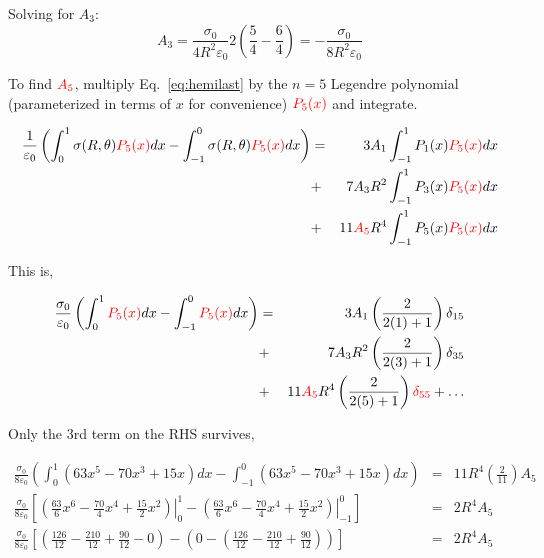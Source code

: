 \documentclass[12pt]{article}
\begin{document}
\begin{flushleft}
Solving for $A_{3}$:
\begin{equation*}
 A_{3} = \frac{\sigma_{0}}{4R^{2}\varepsilon_{0}}2\left( \frac{5}{4} - \frac{6}{4} \right) = - \frac{\sigma_{0}}{8R^{2}\varepsilon_{0}}
\end{equation*}

To find $\textcolor{red} {A_{5}}$, multiply Eq.~\ref{eq:hemilast} by the $n=5$ Legendre polynomial (parameterized in terms of $x$ for convenience) $\textcolor{red} {P_{5}(x)}$ and integrate.

\begin{eqnarray*}
\frac{1}{\varepsilon_{0}}\left( \int_{0}^{1} \sigma(R,\theta)\textcolor{red} {P_{5}(x)} dx -  \int_{-1}^{0} \sigma(R,\theta) \textcolor{red} {P_{5}(x)} dx \right) & = & 3A_{1} \int_{-1}^{1} P_{1}(x) \textcolor{red}{P_{5}(x)} dx \\
& + & 7 A_{3} R^{2} \int_{-1}^{1} P_{3}(x) \textcolor{red}{P_{5}(x)} dx \\
& + & 11 \textcolor{red} {A_{5}} R^{4} \int_{-1}^{1} P_{5}(x) \textcolor{red}{P_{5}(x)} dx 
\end{eqnarray*}

This is,

\begin{eqnarray*}
\frac{\sigma_{0}}{\varepsilon_{0}} \left( \int_{0}^{1} \textcolor{red} {P_{5}(x)} dx - \int_{-1}^{0} \textcolor{red} {P_{5}(x)} dx \right) & =  & 3 A_{1} \left( \frac{2}{2(1)+1} \right) \delta_{15}\\
& + & 7 A_{3} R^{2}   \left( \frac{2}{2(3)+1} \right) \delta_{35}\\
& + & 11\textcolor{red} {A_{5}} R^{4} \left( \frac{2}{2(5)+1} \right) \textcolor{red} {\delta_{55}}   + \ldots
\end{eqnarray*}

Only the 3rd term on the RHS survives,

\begin{eqnarray*}
\frac{\sigma_{0}}{8\varepsilon_{0}} \left( \int_{0}^{1} (63x^{5}-70x^{3}+15x) dx - \int_{-1}^{0}  (63x^{5}-70x^{3}+15x) dx \right) & = &  11R^{4}\left( \frac{2}{11} \right) A_{5}  \\[4pt]
\frac{\sigma_{0}}{8\varepsilon_{0}}\left[ \left. \left( \frac{63}{6}x^{6}-\frac{70}{4}x^{4}+ \frac{15}{2} x^{2} \right) \right|_{0}^{1} -  \left. \left( \frac{63}{6}x^{6}-\frac{70}{4}x^{4}+\frac{15}{2} x^{2} \right) \right|_{-1}^{0} \right] & = &  2R^{4} A_{5}   \\[4pt]
\frac{\sigma_{0}}{8\varepsilon_{0}}\left[ \left( \frac{126}{12}-\frac{210}{12} + \frac{90}{12} - 0 \right)  -  \left( 0 - \left( \frac{126}{12}-\frac{210}{12} + \frac{90}{12} \right) \right)  \right] & = &  2R^{4} A_{5} 
\end{eqnarray*}


\end{flushleft}
\end{document}
